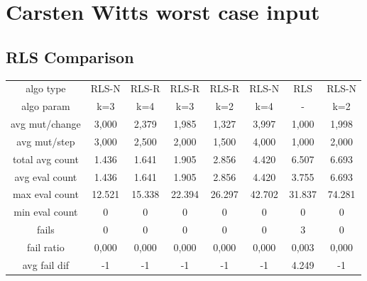 \section{Carsten Witts worst case input}
\subsection{RLS Comparison}
\begin{tabular}[h]{cccccccc}
algo type&         RLS-N&  RLS-R&  RLS-R&  RLS-R&  RLS-N&    RLS&  RLS-N\\
algo param&          k=3&    k=4&    k=3&    k=2&    k=4&      -&    k=2\\
avg mut/change&    3,000&  2,379&  1,985&  1,327&  3,997&  1,000&  1,998\\
avg mut/step&      3,000&  2,500&  2,000&  1,500&  4,000&  1,000&  2,000\\
\hline
total avg count&   1.436&  1.641&  1.905&  2.856&  4.420&  6.507&  6.693\\
avg eval count&    1.436&  1.641&  1.905&  2.856&  4.420&  3.755&  6.693\\
max eval count&   12.521& 15.338& 22.394& 26.297& 42.702& 31.837& 74.281\\
min eval count&        0&      0&      0&      0&      0&      0&      0\\
\hline
fails&                 0&      0&      0&      0&      0&      3&      0\\
fail ratio&        0,000&  0,000&  0,000&  0,000&  0,000&  0,003&  0,000\\
avg fail dif&         -1&     -1&     -1&     -1&     -1&  4.249&     -1\\
\end{tabular}
